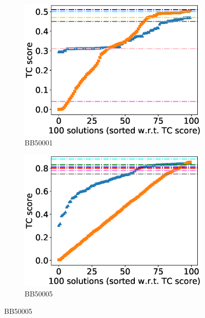 \begin{figure}[!htbp]
	
	\begin{adjustwidth}{-1cm}{-1cm}
		\centering
		\begin{subfigure}{0.22\textwidth}
			\includegraphics[width=\columnwidth]{Figure/summary/precomputedInit/Balibase/BB50001_tc_density_single_run_2}
			\caption{BB50001}
		\end{subfigure}	
		\begin{subfigure}{0.22\textwidth}
			\includegraphics[width=\columnwidth]{Figure/summary/precomputedInit/Balibase/BB50005_tc_density_single_run_2}
			\caption{BB50005}
		\end{subfigure}

\end{adjustwidth}
\end{figure}
